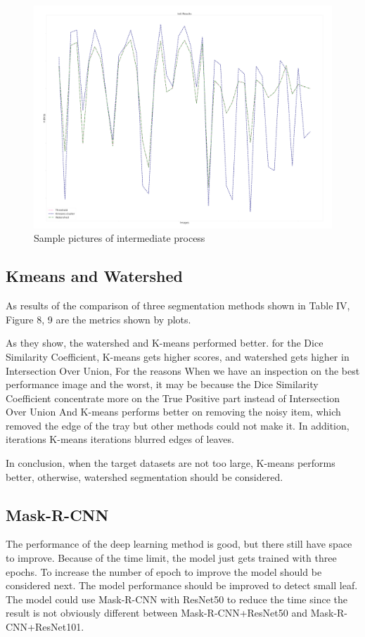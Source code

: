 \documentclass[conference]{IEEEtran}
\begin{document}
\begin{figure}[htbp]
\centerline{\includegraphics[scale=0.15]{IOU.png}}
\caption{Sample pictures of intermediate process }
\label{fig9}
\end{figure}

\subsection{Kmeans and Watershed}
As results of the comparison of three segmentation methods shown in Table IV, Figure 8, 9 are the metrics shown by plots.

As they show, the watershed and K-means performed better.
for the Dice Similarity Coefficient, K-means gets higher scores, and watershed gets higher in Intersection Over Union,
For the reasons
When we have an inspection on the best performance image and the worst,
it may be because the Dice Similarity Coefficient concentrate more on the True Positive part instead of Intersection Over Union
And K-means performs better on removing the noisy item,
which removed the edge of the tray but other methods could not make it.
In addition, iterations K-means iterations blurred edges of leaves.

In conclusion, when the target datasets are not too large, K-means performs better, otherwise, watershed segmentation should be considered.

\subsection{Mask-R-CNN}
The performance of the deep learning method is good, but there still have space to improve. Because of the time limit, the model just gets trained with three epochs. To increase the number of epoch to improve the model should be considered next. The model performance should be improved to detect small leaf. The model could use Mask-R-CNN with ResNet50 to reduce the time since the result is not obviously different between Mask-R-CNN+ResNet50 and Mask-R-CNN+ResNet101.
\end{document}
